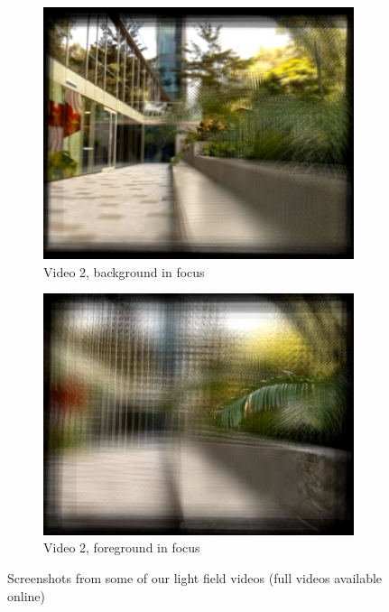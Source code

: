\documentclass{article} \usepackage{acra}
\begin{document}
\begin{figure}[H]
\begin{subfigure}[b]{0.73\columnwidth}
    \includegraphics[width=\textwidth]{images/vid_2}
    \caption{Video 2, background in focus}
  \end{subfigure}
  \begin{subfigure}[b]{0.73\columnwidth}
    \includegraphics[width=\textwidth]{images/vid_1}
    \caption{Video 2, foreground in focus}
  \end{subfigure}
  \caption{Screenshots from some of our light field videos (full videos
    available online) \protect\cite{stewart2017using}}
  \label{fig:video_screens}
\end{figure}
\end{document}
